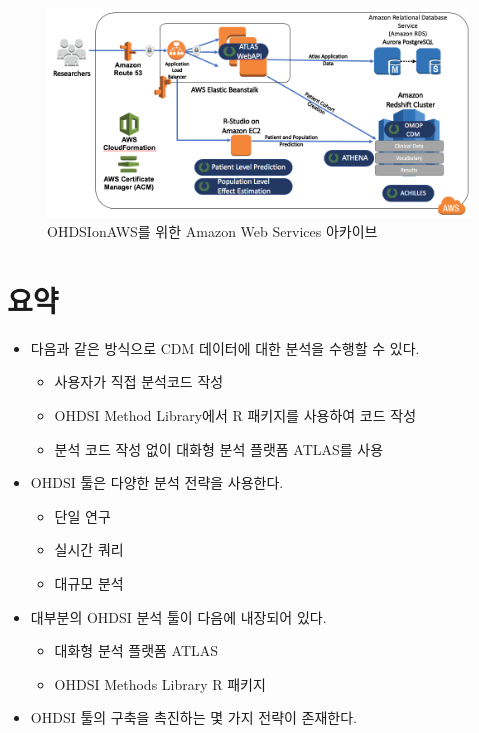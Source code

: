 \documentclass[10.5pt]{book}
\providecommand{\tightlist}{%
  \setlength{\itemsep}{0pt}\setlength{\parskip}{0pt}}
\theoremstyle{definition}
\theoremstyle{definition}
\theoremstyle{definition}
\theoremstyle{remark}
\let\BeginKnitrBlock\begin \let\EndKnitrBlock\end
\begin{document}
\begin{figure}

{\centering \includegraphics[width=1\linewidth]{images/OhdsiAnalyticsTools/OHDSIonAWSDiagram} 

}

\caption{OHDSIonAWS를 위한 Amazon Web Services 아카이브}\label{fig:ohdsionawsDiagram}
\end{figure}

\section{요약}\label{-6}

\BeginKnitrBlock{rmdsummary}
\begin{itemize}
\tightlist
\item
  다음과 같은 방식으로 CDM 데이터에 대한 분석을 수행할 수 있다.

  \begin{itemize}
  \tightlist
  \item
    사용자가 직접 분석코드 작성
  \item
    OHDSI Method Library에서 R 패키지를 사용하여 코드 작성
  \item
    분석 코드 작성 없이 대화형 분석 플랫폼 ATLAS를 사용
  \end{itemize}
\item
  OHDSI 툴은 다양한 분석 전략을 사용한다.

  \begin{itemize}
  \tightlist
  \item
    단일 연구
  \item
    실시간 쿼리
  \item
    대규모 분석
  \end{itemize}
\item
  대부분의 OHDSI 분석 툴이 다음에 내장되어 있다.

  \begin{itemize}
  \tightlist
  \item
    대화형 분석 플랫폼 ATLAS
  \item
    OHDSI Methods Library R 패키지
  \end{itemize}
\item
  OHDSI 툴의 구축을 촉진하는 몇 가지 전략이 존재한다.
\end{itemize}
\EndKnitrBlock{rmdsummary}
\end{document}
